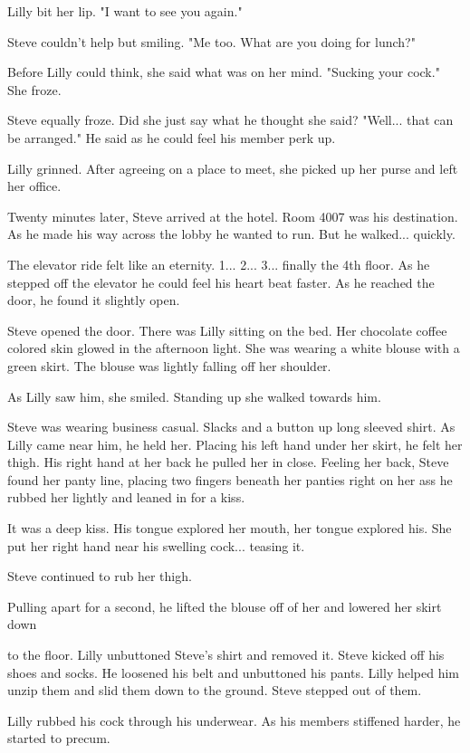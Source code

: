 Lilly bit her lip. "I want to see you again."

Steve couldn't help but smiling. "Me too. What are you doing for lunch?"

Before Lilly could think, she said what was on her mind. "Sucking your cock." She froze.

Steve equally froze. Did she just say what he thought she said? "Well... that can be arranged." He said as he could feel his member perk up.

Lilly grinned. After agreeing on a place to meet, she picked up her purse and left her office.

Twenty minutes later, Steve arrived at the hotel. Room 4007 was his destination. As he made his way across the lobby he wanted to run. But he walked... quickly.

The elevator ride felt like an eternity. 1... 2... 3... finally the 4th floor. As he stepped off the elevator he could feel his heart beat faster. As he reached the door, he found it slightly open.

Steve opened the door. There was Lilly sitting on the bed. Her chocolate coffee colored skin glowed in the afternoon light. She was wearing a white blouse with a green skirt. The blouse was lightly falling off her shoulder.

As Lilly saw him, she smiled. Standing up she walked towards him.

Steve was wearing business casual. Slacks and a button up long sleeved shirt. As Lilly came near him, he held her. Placing his left hand under her skirt, he felt her thigh. His right hand at her back he pulled her in close. Feeling her back, Steve found her panty line, placing two fingers beneath her panties right on her ass he rubbed her lightly and leaned in for a kiss.

It was a deep kiss. His tongue explored her mouth, her tongue explored his. She put her right hand near his swelling cock... teasing it.

Steve continued to rub her thigh.

Pulling apart for a second, he lifted the blouse off of her and lowered her skirt down

to the floor. Lilly unbuttoned Steve's shirt and removed it. Steve kicked off his shoes and socks. He loosened his belt and unbuttoned his pants. Lilly helped him unzip them and slid them down to the ground. Steve stepped out of them.

Lilly rubbed his cock through his underwear. As his members stiffened harder, he started to precum.

